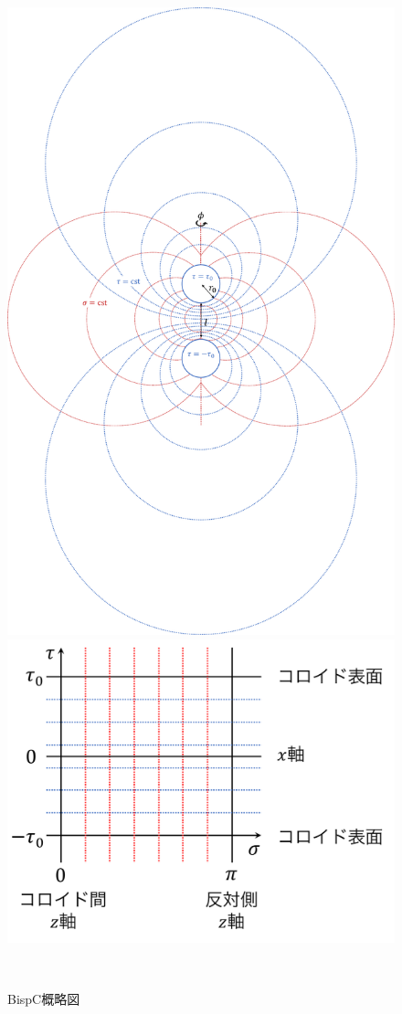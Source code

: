 \documentclass[10.5pt,a4j]{jarticle}
\begin{document}
\begin{figure}[H]
		\centering
            \includegraphics[keepaspectratio,scale=0.3]{Fig/Fig.4/BispC3.pdf}
            \hspace{10mm}
            \includegraphics[keepaspectratio,scale=0.3]{Fig/Fig.4/BispC_Grid.pdf}
            \caption{BispC概略図}
\            \label{Fig.2-3-1}
\end{figure}
\end{document}
